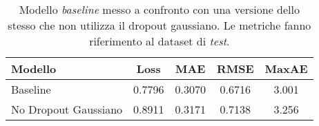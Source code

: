 \begin{table}[tbp]
  \centering
  \begin{tabular}{lcccc}
    \toprule
    Modello & Loss & MAE & RMSE & MaxAE \\
    \midrule
    Baseline      & 0.7796 & 0.3070 & 0.6716 & 3.001 \\
    No Dropout Gaussiano & 0.8911 & 0.3171 & 0.7138 & 3.256 \\
    \bottomrule
  \end{tabular}
  \caption{Modello \emph{baseline} messo a confronto con una versione dello
    stesso che non utilizza il dropout gaussiano. Le metriche fanno riferimento
      al dataset di \emph{test}.}%
  \label{tab:nogaussdrop}%
\end{table}
